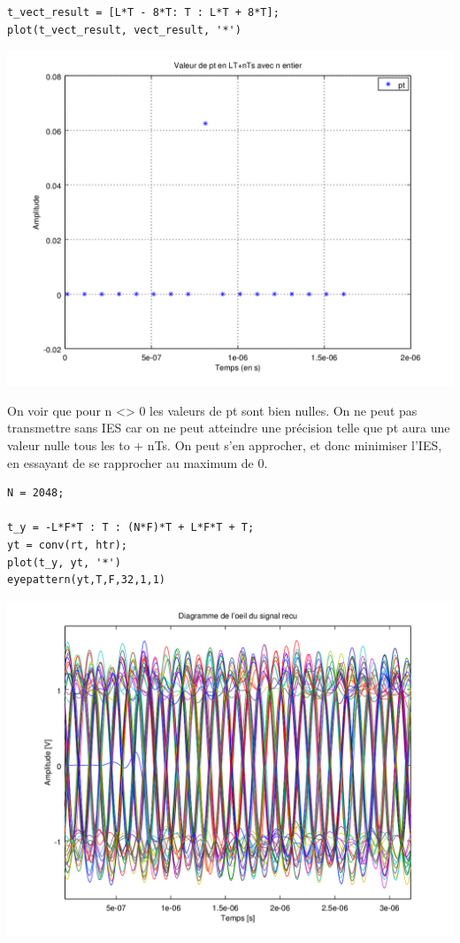 \documentclass{acm_proc_article-sp}
\begin{document}
\begin{center}
\begin{center}
\begin{center}
\begin{lstlisting}
t_vect_result = [L*T - 8*T: T : L*T + 8*T];
plot(t_vect_result, vect_result, '*')
\end{lstlisting}

\includegraphics[scale=0.45]{pt_nyquist_10.png}
\end{center}

On voir que pour n <> 0 les valeurs de pt sont bien nulles. On ne peut pas transmettre sans IES car on ne peut atteindre une précision telle que pt aura une valeur nulle tous les to + nTs. On peut s'en approcher, et donc minimiser l'IES, en essayant de se rapprocher au maximum de 0.

\begin{center}
\begin{lstlisting}
N = 2048;

t_y = -L*F*T : T : (N*F)*T + L*F*T + T;
yt = conv(rt, htr);
plot(t_y, yt, '*')
eyepattern(yt,T,F,32,1,1)
\end{lstlisting}

\includegraphics[scale=0.45]{oeil.png}
\end{center}

\end{center}
\end{center}
\end{document}
